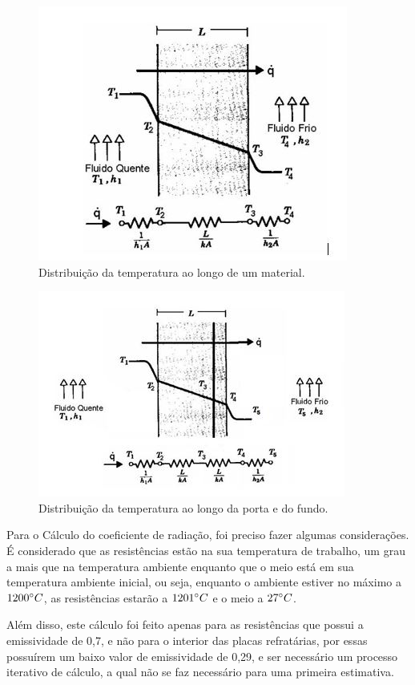 \begin{figure}[!ht]
	\centering
	\label{dist_temperatura}
	\includegraphics[keepaspectratio=true,scale=0.8]{figuras/dist_temperatura.JPG}
	\caption{Distribuição da temperatura ao longo de um material.}
\end{figure}

\begin{figure}[!ht]
	\centering
	\label{dist_temperatura}
	\includegraphics[keepaspectratio=true,scale=1.0]{figuras/dist_temperatura2.JPG}
	\caption{Distribuição da temperatura ao longo da porta e do fundo.}
\end{figure}

Para o Cálculo do coeficiente de radiação, foi preciso fazer algumas considerações. É considerado que as resistências estão na sua temperatura de trabalho, um grau a mais que na temperatura ambiente enquanto que o meio está em sua temperatura ambiente inicial, ou seja, enquanto o ambiente estiver no máximo a $1200\degree C$, as resistências estarão a $1201\degree C$ e o meio a $27\degree C$.

Além disso, este cálculo foi feito apenas para as resistências que possui a emissividade de 0,7, e não para o interior das placas refratárias, por essas possuírem um baixo valor de emissividade de 0,29, e ser necessário um processo iterativo de cálculo, a qual não se faz necessário para uma primeira estimativa.

